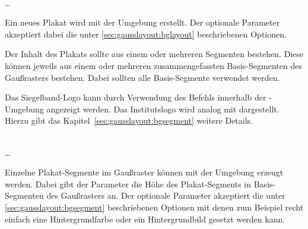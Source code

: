 \begin{Declaration}
    \\
  \quad\dots\\
\end{Declaration}

Ein neues Plakat wird mit der Umgebung  erstellt.
Der optionale Parameter  akzeptiert dabei die
unter \ref{sec:gausslayout:bglayout} beschriebenen Optionen.

Der Inhalt des Plakats sollte aus einem oder mehreren Segmenten bestehen.
Diese können jeweils aus einem oder mehreren zusammengefassten Basis-Segmenten
des Gaußrasters bestehen. Dabei sollten alle Basis-Segmente verwendet werden.

\begin{sloppypar}
Das Siegelband-Logo kann durch Verwendung des Befehls 
innerhalb der -Umgebung angezeigt werden.
Das Institutslogo wird analog mit 
dargestellt. Hierzu gibt das Kapitel~\ref{sec:gausslayout:bgsegment}
weitere Details.
\end{sloppypar}

\begin{Declaration}
    \\
  \quad\dots\\
\end{Declaration}

Einzelne Plakat-Segmente im Gaußraster können mit der Umgebung
 erzeugt werden.
Dabei gibt der Parameter  die Höhe des
Plakat-Segments in Basis-Segmenten des Gaußrasters an.
Der optionale Parameter  akzeptiert die
unter \ref{sec:gausslayout:bgsegment} beschriebenen Optionen mit
denen zum Beispiel recht einfach eine Hintergrundfarbe oder ein Hintergrundbild
gesetzt werden kann.

